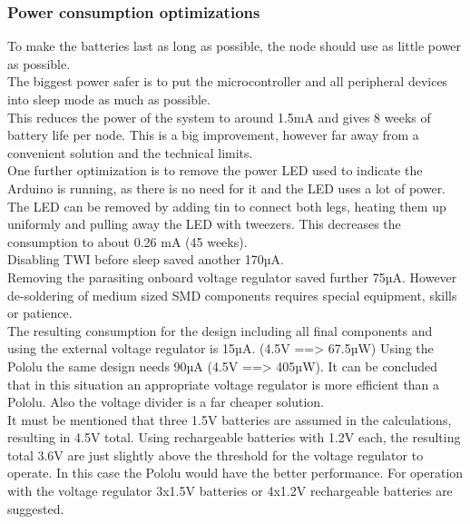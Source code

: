 \subsubsection{Power consumption optimizations}
To make the batteries last as long as possible, the node should use as little power as possible.\\
The biggest power safer is to put the microcontroller and all peripheral devices into sleep mode as much as possible.\\
This reduces the power of the system to around 1.5mA and gives 8 weeks of battery life per node. This is a big improvement, however far away from a convenient solution and the technical limits.\\
One further optimization is to remove the power LED used to indicate the Arduino is running, as there is no need for it and the LED uses a lot of power. The LED can be removed by adding tin to connect both legs, heating them up uniformly and pulling away the LED with tweezers. This decreases the consumption to about 0.26 mA (45 weeks). \\
Disabling TWI before sleep saved another 170µA.\\
Removing the parasiting onboard voltage regulator saved further 75µA. However de-soldering of medium sized SMD components requires special equipment, skills or patience.\\
The resulting consumption for the design including all final components and using the external voltage regulator is 15µA. (4.5V ==> 67.5µW)
Using the Pololu the same design needs 90µA (4.5V ==> 405µW).
It can be concluded that in this situation an appropriate voltage regulator is more efficient than a Pololu. Also the voltage divider is a far cheaper solution.\\
It must be mentioned that three 1.5V batteries are assumed in the calculations, resulting in 4.5V total. Using rechargeable batteries with 1.2V each, the resulting total 3.6V are just slightly above the threshold for the voltage regulator to operate. In this case the Pololu would have the better performance. For operation with the voltage regulator 3x1.5V batteries or 4x1.2V rechargeable batteries are suggested.



